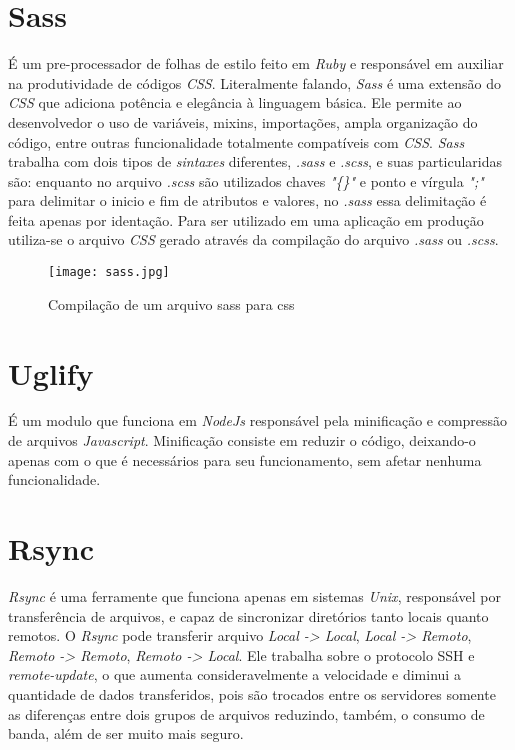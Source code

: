     \section{Sass\label{sec:sass}}
        É um pre-processador de folhas de estilo feito em \emph{Ruby} e responsável em auxiliar na produtividade de códigos \emph{CSS}. Literalmente falando, \emph{Sass} é uma extensão do \emph{CSS} que adiciona potência e elegância à linguagem básica. Ele permite ao desenvolvedor o uso de variáveis, mixins, importações, ampla organização do código, entre outras funcionalidade totalmente compatíveis com \emph{CSS}. \emph{Sass} trabalha com dois tipos de \emph{sintaxes} diferentes, \emph{.sass} e \emph{.scss}, e suas particularidas são: enquanto no arquivo \emph{.scss} são utilizados chaves \emph{"\{\}"} e ponto e vírgula \emph{";"} para delimitar o inicio e fim de atributos e valores, no \emph{.sass} essa delimitação é feita apenas por identação. Para ser utilizado em uma aplicação em produção utiliza-se o arquivo \emph{CSS} gerado através da compilação do arquivo \emph{.sass} ou \emph{.scss}.

        \begin{figure}[!htb]
            \centering
            \texttt{[image: sass.jpg]}
            \caption{\small Compilação de um arquivo sass para css}
            \label{cap:sass}
        \end{figure}


    \section{Uglify\label{sec:uglify}}
        É um modulo que funciona em \emph{NodeJs} responsável pela minificação e compressão de arquivos \emph{Javascript}. Minificação consiste em reduzir o código, deixando-o apenas com o que é necessários para seu funcionamento, sem afetar nenhuma funcionalidade.


    \section{Rsync\label{sec:rsync}}
        \emph{Rsync} é uma ferramente que funciona apenas em sistemas \emph{Unix}, responsável por transferência de arquivos, e capaz de sincronizar diretórios tanto locais quanto remotos. O \emph{Rsync} pode transferir arquivo \emph{Local -> Local}, \emph{Local -> Remoto}, \emph{Remoto -> Remoto}, \emph{Remoto -> Local}. Ele trabalha sobre o protocolo SSH e \emph{remote-update}, o que aumenta consideravelmente a velocidade e diminui a quantidade de dados transferidos, pois são trocados entre os servidores somente as diferenças entre dois grupos de arquivos reduzindo, também, o consumo de banda, além de ser muito mais seguro.


